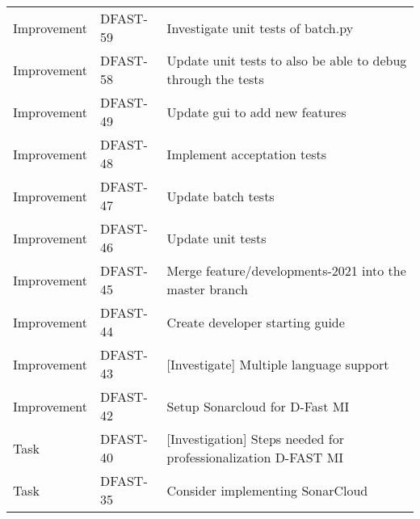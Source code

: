 \documentclass{deltares_memo}
\begin{document}
\begin{longtable}{l|l|p{8cm}}
Improvement & DFAST-59 & Investigate unit tests of batch.py \\
Improvement & DFAST-58 & Update unit tests to also be able to debug through the tests \\
Improvement & DFAST-49 & Update gui to add new features \\
Improvement & DFAST-48 & Implement acceptation tests \\
Improvement & DFAST-47 & Update batch tests \\
Improvement & DFAST-46 & Update unit tests \\
Improvement & DFAST-45 & Merge feature/developments-2021 into the master branch \\
Improvement & DFAST-44 & Create developer starting guide \\
Improvement & DFAST-43 & [Investigate] Multiple language support \\
Improvement	& DFAST-42 & Setup Sonarcloud for D-Fast MI \\
Task & DFAST-40 & [Investigation] Steps needed for professionalization D-FAST MI \\
Task & DFAST-35 & Consider implementing SonarCloud  \\
\end{longtable}

\LastPage
\end{document}
